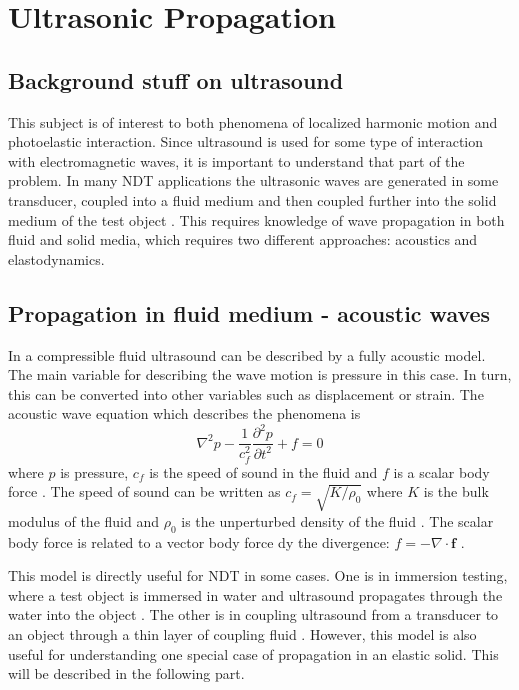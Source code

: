 \documentclass[10pt,a4paper]{eitExjobb}
\begin{document}
	\section{Ultrasonic Propagation}
	
	\subsection{Background stuff on ultrasound}
	This subject is of interest to both phenomena of localized harmonic motion and photoelastic interaction. Since ultrasound is used for some type of interaction with electromagnetic waves, it is important to understand that part of the problem. In many NDT applications the ultrasonic waves are generated in some transducer, coupled into a fluid medium and then coupled further into the solid medium of the test object \cite{Schmerr2016}. This requires knowledge of wave propagation in both fluid and solid media, which requires two different approaches: acoustics and elastodynamics.	
	
	\subsection{Propagation in fluid medium - acoustic waves}
	In a compressible fluid ultrasound can be described by a fully acoustic model. The main variable for describing the wave motion is pressure in this case. In turn, this can be converted into other variables such as displacement or strain. The acoustic wave equation which describes the phenomena is
	\begin{equation*}
	\nabla^2 p - \frac{1}{c_f^2} \frac{\partial^2 p}{\partial t^2} + f = 0
	\end{equation*}
	where $p$ is pressure, $c_f$ is the speed of sound in the fluid and $f$ is a scalar body force \cite{Schmerr2016}. The speed of sound can be written as $c_f = \sqrt{K/\rho_0}$ where $K$ is the bulk modulus of the fluid and $\rho_0$ is the unperturbed density of the fluid \cite{Kaufman2000}. The scalar body force is related to a vector body force dy the divergence: $f = -\nabla \cdot \bm{f}$ \cite{Schmerr2016}.
	
	This model is directly useful for NDT in some cases. One is in immersion testing, where a test object is immersed in water and ultrasound propagates through the water into the object \cite{Schmerr2016}. The other is in coupling ultrasound from a transducer to an object through a thin layer of coupling fluid \cite{Schmerr2016}. However, this model is also useful for understanding one special case of propagation in an elastic solid. This will be described in the following part.
	
\end{document}
